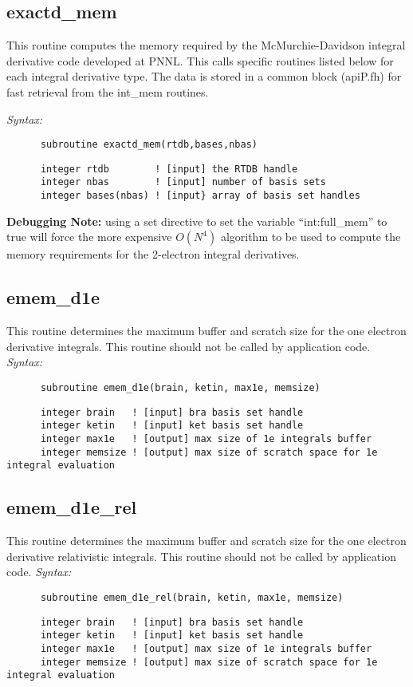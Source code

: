 \subsection{exactd\_mem} 
This routine computes the memory required by the  
McMurchie-Davidson integral derivative code developed at PNNL. 
This calls specific routines listed below for each integral 
derivative type.  The data is stored in a common block (apiP.fh) 
for fast retrieval from the int\_mem routines. 
 
{\it Syntax:} 
\begin{verbatim} 
      subroutine exactd_mem(rtdb,bases,nbas) 
\end{verbatim} 
\begin{verbatim} 
      integer rtdb        ! [input] the RTDB handle 
      integer nbas        ! [input] number of basis sets 
      integer bases(nbas) ! [input} array of basis set handles 
\end{verbatim} 
 
{\bf Debugging Note:} using a set directive to set the  
variable ``int:full\_mem'' to true will force the more  
expensive $O(N^4)$ algorithm to be used to compute the  
memory requirements for the 2-electron integral derivatives. 
 
\subsection{emem\_d1e} 
This routine determines the maximum buffer and scratch size for the  
one electron derivative integrals. 
This routine should not be called by application code. 
{\it Syntax:} 
\begin{verbatim} 
      subroutine emem_d1e(brain, ketin, max1e, memsize) 
\end{verbatim} 
\begin{verbatim} 
      integer brain   ! [input] bra basis set handle 
      integer ketin   ! [input] ket basis set handle 
      integer max1e   ! [output] max size of 1e integrals buffer 
      integer memsize ! [output] max size of scratch space for 1e integral evaluation 
\end{verbatim} 
\subsection{emem\_d1e\_rel} 
This routine determines the maximum buffer and scratch size for the  
one electron derivative relativistic integrals. 
This routine should not be called by application code. 
{\it Syntax:} 
\begin{verbatim} 
      subroutine emem_d1e_rel(brain, ketin, max1e, memsize) 
\end{verbatim} 
\begin{verbatim} 
      integer brain   ! [input] bra basis set handle 
      integer ketin   ! [input] ket basis set handle 
      integer max1e   ! [output] max size of 1e integrals buffer 
      integer memsize ! [output] max size of scratch space for 1e integral evaluation 
\end{verbatim} 
